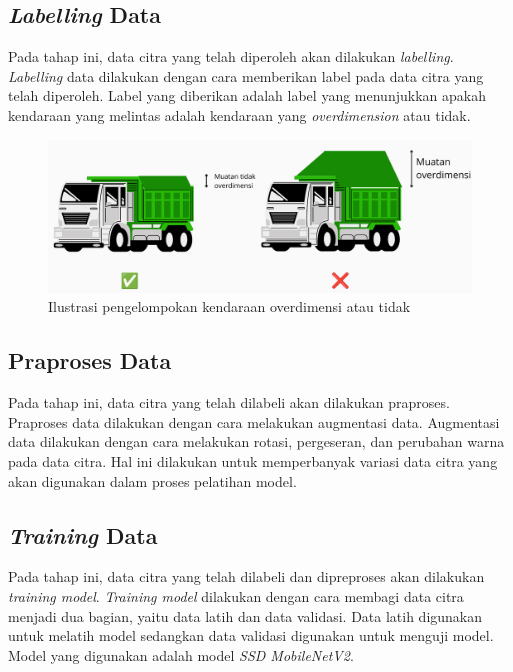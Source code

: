 \subsection{\emph{Labelling} Data}

Pada tahap ini, data citra yang telah diperoleh akan dilakukan \emph{labelling}. \emph{Labelling} data dilakukan dengan cara memberikan label pada data citra yang telah diperoleh. Label yang diberikan adalah label yang menunjukkan apakah kendaraan yang melintas adalah kendaraan yang \emph{overdimension} atau tidak.

\begin{figure}[H]
  \centering

  \includegraphics[scale=0.26]{gambar/bab2-truck-detection-method.png}

  \caption{Ilustrasi pengelompokan kendaraan overdimensi atau tidak}
  \label{fig:truckdetectionmethod}
\end{figure}

\subsection{Praproses Data}

Pada tahap ini, data citra yang telah dilabeli akan dilakukan praproses. Praproses data dilakukan dengan cara melakukan augmentasi data. Augmentasi data dilakukan dengan cara melakukan rotasi, pergeseran, dan perubahan warna pada data citra. Hal ini dilakukan untuk memperbanyak variasi data citra yang akan digunakan dalam proses pelatihan model.

\subsection{\emph{Training} Data}

Pada tahap ini, data citra yang telah dilabeli dan dipreproses akan dilakukan \emph{training model}. \emph{Training model} dilakukan dengan cara membagi data citra menjadi dua bagian, yaitu data latih dan data validasi. Data latih digunakan untuk melatih model sedangkan data validasi digunakan untuk menguji model. Model yang digunakan adalah model \emph{SSD MobileNetV2}.

